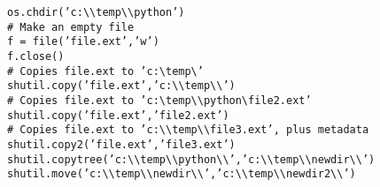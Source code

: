 \documentclass[PyData.tex]{subfiles}
\begin{document}
\begin{framed}
	\begin{verbatim}
os.chdir(’c:\\temp\\python’)
# Make an empty file
f = file(’file.ext’,’w’)
f.close()
# Copies file.ext to ’c:\temp\’
shutil.copy(’file.ext’,’c:\\temp\\’)
# Copies file.ext to ’c:\temp\\python\file2.ext’
shutil.copy(’file.ext’,’file2.ext’)
# Copies file.ext to ’c:\\temp\\file3.ext’, plus metadata
shutil.copy2(’file.ext’,’file3.ext’)
shutil.copytree(’c:\\temp\\python\\’,’c:\\temp\\newdir\\’)
shutil.move(’c:\\temp\\newdir\\’,’c:\\temp\\newdir2\\’)

\end{verbatim}
\end{framed}
\end{document}
